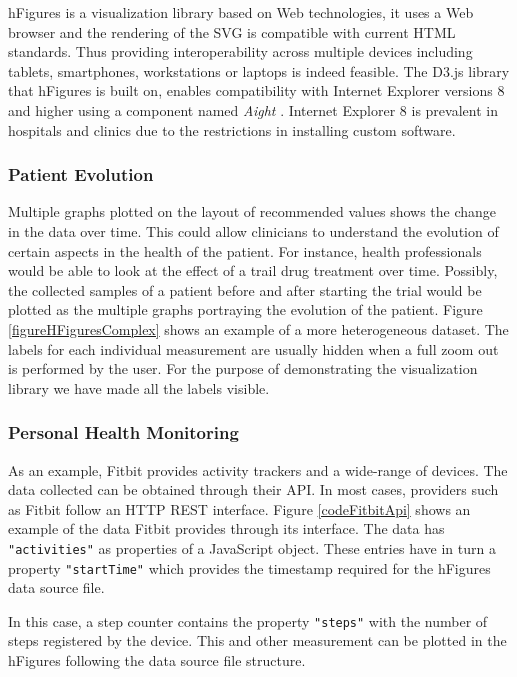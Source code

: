 \documentclass[twocolumn]{bmcart}%
\begin{document}
hFigures is a visualization library based on Web technologies, it uses a Web browser and the rendering of the SVG is compatible with current HTML standards. Thus providing interoperability across multiple devices including tablets, smartphones, workstations or laptops is indeed feasible. The D3.js library that hFigures is built on, enables compatibility with Internet Explorer versions 8 and higher using a component named \textit{Aight} \cite{aight}. Internet Explorer 8 is prevalent in hospitals and clinics due to the restrictions in installing custom software.

\subsubsection*{Patient Evolution}

Multiple graphs plotted on the layout of recommended values shows the change in the data over time. This could allow clinicians to understand the evolution of certain aspects in the health of the patient. For instance, health professionals would be able to look at the effect of a trail drug treatment over time. Possibly, the collected samples of a patient before and after starting the trial would be plotted as the multiple graphs portraying the evolution of the patient. Figure \ref{figureHFiguresComplex} shows an example of a more heterogeneous dataset. The labels for each individual measurement are usually hidden when a full zoom out is performed by the user. For the purpose of demonstrating the visualization library we have made all the labels visible. 


\subsubsection*{Personal Health Monitoring}

As an example, Fitbit provides activity trackers and a wide-range of devices. The data collected can be obtained through their API. In most cases, providers such as Fitbit follow an HTTP REST interface. Figure \ref{codeFitbitApi} shows an example of the data Fitbit provides through its interface. The data has \texttt{"activities"} as properties of a JavaScript object. These entries have in turn a property \texttt{"startTime"} which provides the timestamp required for the hFigures data source file.

In this case, a step counter contains the property \texttt{"steps"} with the number of steps registered by the device. This and other measurement can be plotted in the hFigures following the data source file structure.
\end{document}
